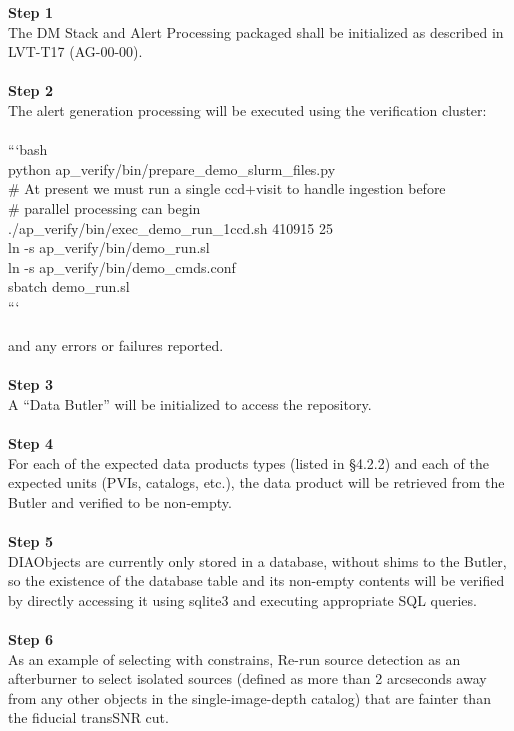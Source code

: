 \textbf{Step 1}\\
The DM Stack and Alert Processing packaged shall be initialized as
described in LVT-T17 (AG-00-00).\\
~\\
\textbf{Step 2}\\
The alert generation processing will be executed using the verification
cluster:\\
~\\
```bash\\
python ap\_verify/bin/prepare\_demo\_slurm\_files.py\\
\# At present we must run a single ccd+visit to handle ingestion
before\\
\# parallel processing can begin\\
./ap\_verify/bin/exec\_demo\_run\_1ccd.sh 410915 25\\
ln -s ap\_verify/bin/demo\_run.sl\\
ln -s ap\_verify/bin/demo\_cmds.conf\\
sbatch demo\_run.sl\\
```\\
~\\
and any errors or failures reported.\\
~\\
\textbf{Step 3}\\
A ``Data Butler'' will be initialized to access the repository.\\
~\\
\textbf{Step 4}\\
For each of the expected data products types (listed in §4.2.2) and each
of the expected units (PVIs, catalogs, etc.), the data product will be
retrieved from the Butler and verified to be non-empty.\\
~\\
\textbf{Step 5}\\
DIAObjects are currently only stored in a database, without shims to the
Butler, so the existence of the database table and its non-empty
contents will be verified by directly accessing it using sqlite3 and
executing appropriate SQL queries.\\
~\\
\textbf{Step 6}\\
As an example of selecting with constrains, Re-run source detection as
an afterburner to select isolated sources (defined as more than 2
arcseconds away from any other objects in the single-image-depth
catalog) that are fainter than the fiducial transSNR cut.\\
~\\

